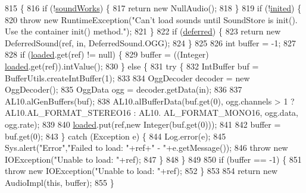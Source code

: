 \begin{DoxyCode}
815                                                                        \{
816         \textcolor{keywordflow}{if} (!\mbox{\hyperlink{classorg_1_1newdawn_1_1slick_1_1openal_1_1_sound_store_ae563e9c1a01e333dc2350f1450f451fd}{soundWorks}}) \{
817             \textcolor{keywordflow}{return} \textcolor{keyword}{new} NullAudio();
818         \}
819         \textcolor{keywordflow}{if} (!\mbox{\hyperlink{classorg_1_1newdawn_1_1slick_1_1openal_1_1_sound_store_ad607db06655c505a0d3aa73eb16a06e1}{inited}}) \{
820             \textcolor{keywordflow}{throw} \textcolor{keyword}{new} RuntimeException(\textcolor{stringliteral}{"Can't load sounds until SoundStore is init(). Use the container
       init() method."});
821         \}
822         \textcolor{keywordflow}{if} (\mbox{\hyperlink{classorg_1_1newdawn_1_1slick_1_1openal_1_1_sound_store_a19c18b8305a40c99b51cde881a6f1d32}{deferred}}) \{
823             \textcolor{keywordflow}{return} \textcolor{keyword}{new} DeferredSound(ref, in, DeferredSound.OGG);
824         \}
825         
826         \textcolor{keywordtype}{int} buffer = -1;
827         
828         \textcolor{keywordflow}{if} (\mbox{\hyperlink{classorg_1_1newdawn_1_1slick_1_1openal_1_1_sound_store_a886b8963df160c2a880f5a33e37397fc}{loaded}}.get(ref) != null) \{
829             buffer = ((Integer) \mbox{\hyperlink{classorg_1_1newdawn_1_1slick_1_1openal_1_1_sound_store_a886b8963df160c2a880f5a33e37397fc}{loaded}}.get(ref)).intValue();
830         \} \textcolor{keywordflow}{else} \{
831             \textcolor{keywordflow}{try} \{
832                 IntBuffer buf = BufferUtils.createIntBuffer(1);
833                 
834                 OggDecoder decoder = \textcolor{keyword}{new} OggDecoder();
835                 OggData ogg = decoder.getData(in);
836                 
837                 AL10.alGenBuffers(buf);
838                 AL10.alBufferData(buf.get(0), ogg.channels > 1 ? AL10.AL\_FORMAT\_STEREO16 : AL10.
      AL\_FORMAT\_MONO16, ogg.data, ogg.rate);
839                 
840                 \mbox{\hyperlink{classorg_1_1newdawn_1_1slick_1_1openal_1_1_sound_store_a886b8963df160c2a880f5a33e37397fc}{loaded}}.put(ref,\textcolor{keyword}{new} Integer(buf.get(0)));
841                                      
842                 buffer = buf.get(0);
843             \} \textcolor{keywordflow}{catch} (Exception e) \{
844                 Log.error(e);
845                 Sys.alert(\textcolor{stringliteral}{"Error"},\textcolor{stringliteral}{"Failed to load: "}+ref+\textcolor{stringliteral}{" - "}+e.getMessage());
846                 \textcolor{keywordflow}{throw} \textcolor{keyword}{new} IOException(\textcolor{stringliteral}{"Unable to load: "}+ref);
847             \}
848         \}
849         
850         \textcolor{keywordflow}{if} (buffer == -1) \{
851             \textcolor{keywordflow}{throw} \textcolor{keyword}{new} IOException(\textcolor{stringliteral}{"Unable to load: "}+ref);
852         \}
853         
854         \textcolor{keywordflow}{return} \textcolor{keyword}{new} AudioImpl(\textcolor{keyword}{this}, buffer);
855     \}
\end{DoxyCode}

